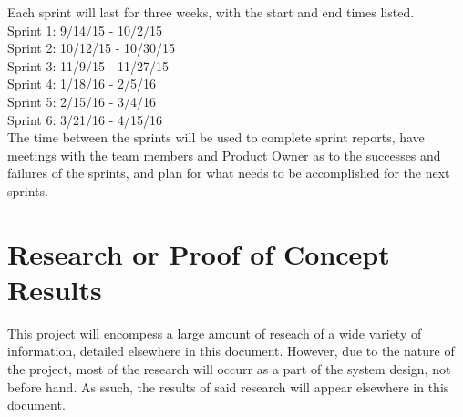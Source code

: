 Each sprint will last for three weeks, with the start and end times listed. \\

Sprint 1: 9/14/15 - 10/2/15 \\
Sprint 2: 10/12/15 - 10/30/15 \\
Sprint 3: 11/9/15 - 11/27/15 \\
Sprint 4: 1/18/16 - 2/5/16 \\
Sprint 5: 2/15/16 - 3/4/16 \\
Sprint 6: 3/21/16 - 4/15/16 \\

The time between the sprints will be used to complete sprint reports, have meetings with the team members and Product Owner as to the successes and failures of the sprints, and plan for what needs to be accomplished for the next sprints.




\section{Research or Proof of Concept Results}


This project will encompess a large amount of reseach of a wide variety of information, detailed elsewhere in this document. However, due to the nature of the project, most of the research will occurr as a part of the system design, not before hand. As ssuch, the results of said research will appear elsewhere in this document.

